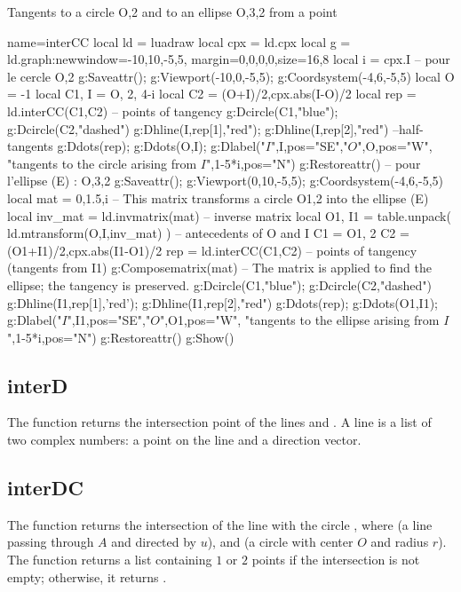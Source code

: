 \begin{demo}{Tangents to a circle {O,2} and to an ellipse {O,3,2} from a point}
\begin{luadraw}{name=interCC}
local ld = luadraw
local cpx = ld.cpx
local g = ld.graph:new{window={-10,10,-5,5}, margin={0,0,0,0},size={16,8}}
local i = cpx.I
-- pour le cercle {O,2}
g:Saveattr(); g:Viewport(-10,0,-5,5); g:Coordsystem(-4,6,-5,5)
local O = -1
local C1, I = {O, 2}, 4-i
local C2 = {(O+I)/2,cpx.abs(I-O)/2}
local rep = ld.interCC(C1,C2) -- points of tangency
g:Dcircle(C1,"blue"); g:Dcircle(C2,"dashed")
g:Dhline(I,rep[1],"red"); g:Dhline(I,rep[2],"red") --half-tangents
g:Ddots(rep); g:Ddots({O,I}); g:Dlabel("$I$",I,{pos="SE"},"$O$",O,{pos="W"},
  "tangents to the circle arising from $I$",1-5*i,{pos="N"})
g:Restoreattr()
-- pour l'ellipse (E) : {O,3,2}
g:Saveattr(); g:Viewport(0,10,-5,5); g:Coordsystem(-4,6,-5,5)
local mat = {0,1.5,i} -- This matrix transforms a circle {O1,2} into the ellipse (E)
local inv_mat = ld.invmatrix(mat) -- inverse matrix
local O1, I1 = table.unpack( ld.mtransform({O,I},inv_mat) ) -- antecedents of O and I
C1 = {O1, 2}
C2 = {(O1+I1)/2,cpx.abs(I1-O1)/2}
rep = ld.interCC(C1,C2) -- points of tangency (tangents from I1)
g:Composematrix(mat) -- The matrix is applied to find the ellipse; the tangency is preserved.
g:Dcircle(C1,"blue"); g:Dcircle(C2,"dashed")
g:Dhline(I1,rep[1],'red'); g:Dhline(I1,rep[2],"red")
g:Ddots(rep); g:Ddots({O1,I1}); g:Dlabel("$I$",I1,{pos="SE"},"$O$",O1,{pos="W"},
  "tangents to the ellipse arising from $I$",1-5*i,{pos="N"})
g:Restoreattr()
g:Show()
\end{luadraw}
\end{demo}

\subsection{interD}

The function  returns the intersection point of the lines  and . A line is a list of two complex numbers: a point on the line and a direction vector.

\subsection{interDC}

The function  returns the intersection of the line  with the circle , where  (a line passing through $A$ and directed by $u$), and  (a circle with center $O$ and radius $r$). The function returns a list containing $1$ or $2$ points if the intersection is not empty; otherwise, it returns \nil.

